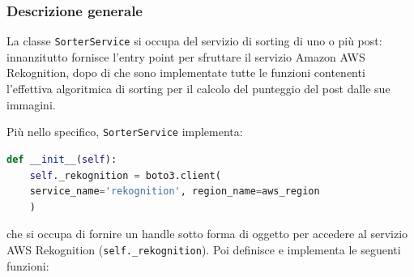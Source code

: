 \subsubsection{Descrizione generale}
La classe \verb+SorterService+ si occupa del servizio di sorting di uno o più post: innanzitutto fornisce l'entry point per sfruttare il servizio Amazon AWS Rekognition, dopo di che sono implementate tutte le funzioni contenenti l'effettiva algoritmica di sorting per il calcolo del punteggio del post dalle sue immagini.

Più nello specifico, \verb+SorterService+ implementa:
\begin{lstlisting}[language=Python]
    def __init__(self):
    self._rekognition = boto3.client(
    service_name='rekognition', region_name=aws_region
    )
\end{lstlisting} 
che si occupa di fornire un handle sotto forma di oggetto per accedere al servizio AWS Rekognition
(\verb+self._rekognition+). 
Poi definisce e implementa le seguenti funzioni:
